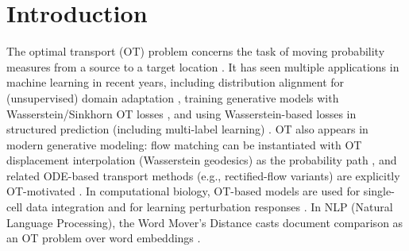 \documentclass{article}
\theoremstyle{plain}
\theoremstyle{definition}
\theoremstyle{remark}
\numberwithin{equation}{section}
\begin{document}
\begin{abstract}
Quadratic regularization has emerged as a potential alternative to the popular entropic regularization in computational optimal transport, offering the theoretical advantage of producing sparse couplings through its hinge density structure. 
Despite recent progress in one-dimensional settings and general upper bounds, fundamental questions about the localization rate of QOT optimizers around the Monge coupling have remained open. 
In this work, we establish a general lower bound showing that the support of the QOT optimizer cannot concentrate around the Monge graph faster than order $\varepsilon^{\frac{1}{d+2}}$ in the directed Hausdorff distance, matching the conjectured optimal exponent under standard regularity assumptions in \citet{wiesel2025sparsity}. 
We also show that the QOT value gap controls the mean-squared deviation $\mathbb E_{\pi_\varepsilon}\|y-T(x)\|^2$ by the scale of $\varepsilon^{\frac{2}{d+2}}$. 
As a corollary, in the affine Brenier regime, which includes Gaussian-to-Gaussian transport, we derive a sharp pointwise tube bound of order $\varepsilon^{\frac{1}{d+2}}$ by reducing the problem to self-transport and applying recent self-transport sparsity results. 
Finally, we validate our theoretical bound with a synthetic experiment in high-dimensional settings.
\end{abstract}
\section{Introduction}
The optimal transport (OT) problem concerns the task of moving probability measures from a source to a target location \citep{monge1781memoire}.
It has seen multiple applications in machine learning in recent years, including distribution alignment for (unsupervised) domain adaptation \citep{courty2016optimal}, training generative models with Wasserstein/Sinkhorn OT losses \citep{arjovsky2017wasserstein,genevay2018learning}, and using Wasserstein-based losses in structured prediction (including multi-label learning) \citep{frogner2015learning}.
OT also appears in modern generative modeling: flow matching can be instantiated with OT displacement interpolation (Wasserstein geodesics) as the probability path \citep{lipman2023flow}, and related ODE-based transport methods (e.g., rectified-flow variants) are explicitly OT-motivated \citep{liu2022rectified}.
In computational biology, OT-based models are used for single-cell data integration and for learning perturbation responses \citep{schiebinger2019optimal,bunne2023learning,bunne2024optimal}.
In NLP (Natural Language Processing), the Word Mover's Distance casts document comparison as an OT problem over word embeddings \citep{kusner2015word}.
\end{document}

